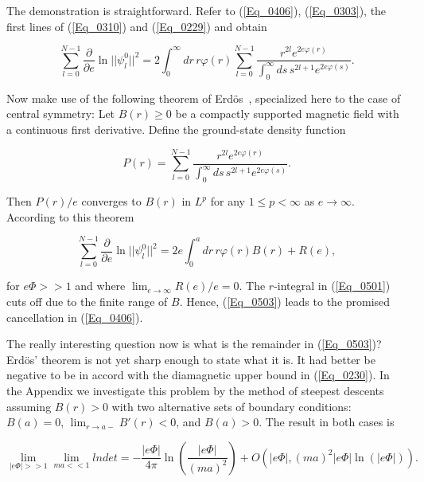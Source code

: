 \documentclass[a4paper,twocolumn,showpacs,preprintnumbers,amsmath,amssymb]{revtex4}
\newcommand{\pdo}[1]{\ensuremath{\frac{\partial }
        {\partial #1 }}}
\begin{document}
The demonstration is straightforward. Refer to (\ref{Eq_0406}),
(\ref{Eq_0303}), the first lines of (\ref{Eq_0310}) and
(\ref{Eq_0229}) and obtain

\begin{widetext}
\begin{equation}
\label{Eq_0501}
\sum^{N-1}_{l=0} \pdo{e}\ln||\psi^0_l||^2
  = 2 \int^{\infty}_0 dr \, r \varphi(r)
    \sum^{N-1}_{l=0}
    \frac{r^{2l} e^{2e\varphi(r)}}
         {\int^{\infty}_0 ds \, s^{2l+1} e^{2e\varphi(s)}}.
\end{equation}
\end{widetext}

\noindent
Now make use of the following theorem of Erd\"{o}s~\cite{Erdos93},
specialized here to the case of central symmetry: Let $B(r)\ge0$ be a
compactly supported magnetic field with a continuous first
derivative. Define the ground-state density function

\begin{equation}
\label{Eq_0502}
P(r) = \sum^{N-1}_{l=0}
  \frac{r^{2l} e^{2e\varphi(r)}}
       {\int^{\infty}_0 ds \, s^{2l+1} e^{2e\varphi(s)}}.
\end{equation}

\noindent
Then $P(r)/e$ converges to $B(r)$ in $L^p$  for any $1 \le p < \infty$
as $e \to \infty$. According to this theorem

\begin{equation}
\label{Eq_0503}
\sum^{N-1}_{l=0} \pdo{e}\ln ||\psi^0_l||^2
  = 2e \int^a_0 dr \, r \varphi(r) B(r) + R(e),
\end{equation}

\noindent
for $e\Phi >> 1$ and where $\lim_{e \to \infty} R(e)/e = 0$. The
$r$-integral in (\ref{Eq_0501}) cuts off due to the finite range of
$B$. Hence, (\ref{Eq_0503}) leads to the promised cancellation in
(\ref{Eq_0406}).

The really interesting question now is what is the remainder in
(\ref{Eq_0503})? Erd\"{o}s' theorem is not yet sharp enough to state
what it is. It had better be negative to be in accord with the
diamagnetic upper bound in (\ref{Eq_0230}). In the Appendix we
investigate this problem by the method of steepest descents assuming
$B(r)>0$ with two alternative sets of boundary conditions: $B(a)=0$,
$\lim_{r \to a-} B'(r) < 0$, and $B(a)>0$. The result in both cases is

\begin{widetext}
\begin{equation}
\label{Eq_0504}
\lim_{|e\Phi| >> 1} \lim_{ma << 1} lndet
  = -\frac{|e\Phi|}{4\pi} \ln\left(\frac{|e\Phi|}{(ma)^2}\right)
    + O(|e\Phi|,(ma)^2|e\Phi|\ln(|e\Phi|)).
\end{equation}
\end{widetext}
\end{document}
